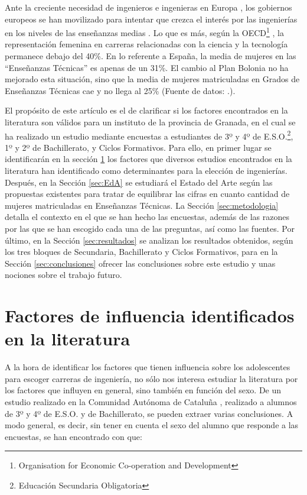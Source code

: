 \documentclass[runningheads,a4paper]{llncs}
\begin{document}
Ante la creciente necesidad de ingenieros e ingenieras en Europa \cite{gago2004europe}, los gobiernos europeos se han movilizado para intentar que crezca el interés por las ingenierías en los niveles de las enseñanzas medias \cite{Kearney2014}. Lo que es más, según la OECD\footnote{Organisation for Economic Co-operation and Development} \cite{OECD2006}, la representación femenina en carreras relacionadas con la ciencia y la tecnología permanece debajo del 40\%. En lo referente a España, la media de mujeres en las ``Enseñanzas Técnicas'' es apenas de un 31\%. El cambio al Plan Bolonia \cite{fernandez2009plan} no ha mejorado esta situación, sino que la media de mujeres matriculadas en Grados de Enseñanzas Técnicas cae y no llega al 25\% (Fuente de datos: \cite{datos::uni}.).

El propósito de este artículo es el de clarificar si los factores encontrados en la literatura son válidos para un instituto de la provincia de Granada, en el cual se ha realizado un estudio mediante encuestas a estudiantes de 3º y 4º de E.S.O.\footnote{Educación Secundaria Obligatoria}, 1º y 2º de Bachillerato, y Ciclos Formativos. Para ello, en primer lugar se identificarán en la sección \ref{sec:factores} los factores que diversos estudios encontrados en la literatura han identificado como determinantes para la elección de ingenierías. Después, en la Sección \ref{sec:EdA} se estudiará el Estado del Arte según las propuestas existentes para tratar de equilibrar las cifras en cuanto cantidad de mujeres matriculadas en Enseñanzas Técnicas. La Sección \ref{sec:metodologia} detalla el contexto en el que se han hecho las encuestas, además de las razones por las que se han escogido cada una de las preguntas, así como las fuentes. Por último, en la Sección \ref{sec:resultados} se analizan los resultados obtenidos, según los tres bloques de Secundaria, Bachillerato y Ciclos Formativos, para en la Sección \ref{sec:conclusiones} ofrecer las conclusiones sobre este estudio y unas nociones sobre el trabajo futuro.

\section{Factores de influencia identificados en la literatura}
\label{sec:factores}

A la hora de identificar los factores que tienen influencia sobre los adolescentes para escoger carreras de ingeniería, no sólo nos interesa estudiar la literatura por los factores que influyen en general, sino también en función del sexo. De un estudio realizado en la Comunidad Autónoma de Cataluña \cite{everis2012}, realizado a alumnos de 3º y 4º de E.S.O. y de Bachillerato, se pueden extraer varias conclusiones. A modo general, es decir, sin tener en cuenta el sexo del alumno que responde a las encuestas, se han encontrado con que:
\end{document}
